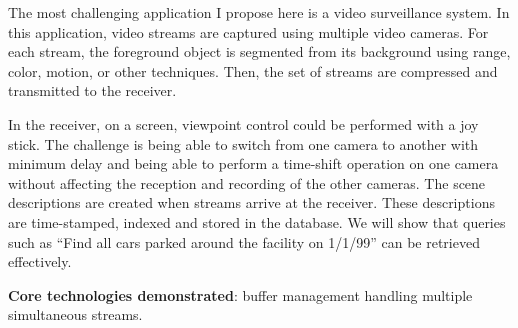 The most challenging application I propose here is a video
surveillance system.
In this application, video streams are captured 
using multiple video cameras.
For each stream, the 
foreground object is segmented from its background using range, color, 
motion, or other techniques. Then, the set of streams 
are compressed and transmitted to the receiver. 

In the receiver, on a screen, 
viewpoint control could be performed with a joy stick.
The challenge is being able to switch from one
camera to another with minimum
delay and being able to perform a time-shift
operation on one camera without affecting the
reception and recording of the other
cameras. The scene descriptions are created when 
streams arrive at the receiver. These descriptions
are time-stamped, indexed and stored in the database.
We will show that queries such as 
``Find all cars parked around
the facility on 1/1/99'' can be retrieved effectively.

{\bf Core technologies demonstrated}: 
buffer management handling
multiple simultaneous streams.

